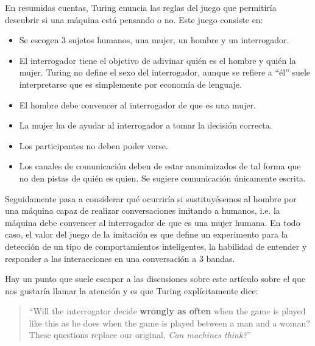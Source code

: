 \documentclass[12pt]{memoir}
\begin{document}
En resumidas cuentas, Turing enuncia las reglas del juego que permitiría descubrir si una máquina está pensando o no. Este juego consiste en: 
\begin{itemize}
    \item Se escogen 3 sujetos humanos, una mujer, un hombre y un interrogador.
    \item El interrogador tiene el objetivo de adivinar quién es el hombre y quién la mujer. Turing no define el sexo del interrogador, aunque se refiere a ``él'' suele interpretarse que es simplemente por economía de lenguaje.
    \item El hombre debe convencer al interrogador de que es una mujer.
    \item La mujer ha de ayudar al interrogador a tomar la decisión correcta.
    \item Los participantes no deben poder verse.
    \item Los canales de comunicación deben de estar anonimizados de tal forma que no den pistas de quién es quien. Se sugiere comunicación únicamente escrita.
\end{itemize}

Seguidamente pasa a considerar qué ocurriría si sustituyésemos al hombre por una máquina capaz de realizar conversaciones imitando a humanos, i.e. la máquina debe convencer al interrogador de que es una mujer humana. En todo caso, el valor del juego de la imitación es que define un experimento para la detección de un tipo de comportamientos inteligentes, la habilidad de entender y responder a las interacciones en una conversación a 3 bandas.


Hay un punto que suele escapar a las discusiones sobre este artículo sobre el que nos gustaría llamar la atención y es que Turing explícitamente dice:
 
\begin{quotation}
``Will the interrogator decide \textbf{wrongly as often} when the game is played like this as he does when the game is played between a man and a woman? These questions replace our original, \textit{Can machines think?}''  \parencite[apartado 1]{Turing1950cmi}
\end{quotation} 
\end{document}
